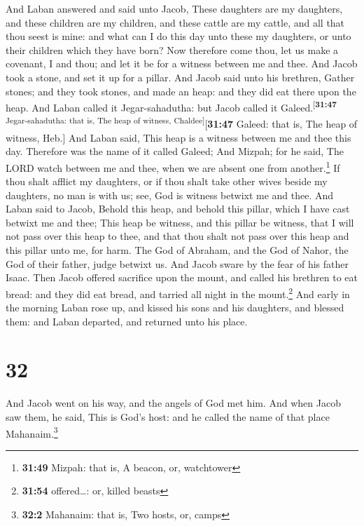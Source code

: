  And Laban answered and said unto Jacob, These daughters
are my daughters, and these children are my children, and these cattle
are my cattle, and all that thou seest is mine: and what can I do this
day unto these my daughters, or unto their children which they have
born?  Now therefore come thou, let us make a covenant, I
and thou; and let it be for a witness between me and thee.
 And Jacob took a stone, and set it up for a pillar.
 And Jacob said unto his brethren, Gather stones; and
they took stones, and made an heap: and they did eat there upon the
heap.  And Laban called it Jegar-sahadutha: but Jacob
called it Galeed.\textsuperscript{{[}\textbf{31:47} Jegar-sahadutha:
that is, The heap of witness, Chaldee{]}}{[}\textbf{31:47} Galeed: that
is, The heap of witness, Heb.{]}  And Laban said, This
heap is a witness between me and thee this day. Therefore was the name
of it called Galeed;  And Mizpah; for he said, The LORD
watch between me and thee, when we are absent one from
another.\footnote{\textbf{31:49} Mizpah: that is, A beacon, or,
  watchtower}  If thou shalt afflict my daughters, or if
thou shalt take other wives beside my daughters, no man is with us; see,
God is witness betwixt me and thee.  And Laban said to
Jacob, Behold this heap, and behold this pillar, which I have cast
betwixt me and thee;  This heap be witness, and this
pillar be witness, that I will not pass over this heap to thee, and that
thou shalt not pass over this heap and this pillar unto me, for harm.
 The God of Abraham, and the God of Nahor, the God of
their father, judge betwixt us. And Jacob sware by the fear of his
father Isaac.  Then Jacob offered sacrifice upon the
mount, and called his brethren to eat bread: and they did eat bread, and
tarried all night in the mount.\footnote{\textbf{31:54} offered\ldots:
  or, killed beasts}  And early in the morning Laban rose
up, and kissed his sons and his daughters, and blessed them: and Laban
departed, and returned unto his place.

\hypertarget{section-31}{%
\section{32}\label{section-31}}

 And Jacob went on his way, and the angels of God met him.
 And when Jacob saw them, he said, This is God's host: and
he called the name of that place Mahanaim.\footnote{\textbf{32:2}
  Mahanaim: that is, Two hosts, or, camps}

